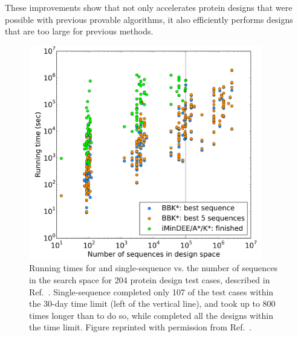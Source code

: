 These improvements show that \bbks not only accelerates protein designs that were possible with previous provable algorithms, it also efficiently performs designs that are too large for previous methods.

\begin{figure}
\center
\includegraphics[width=4in]{figures/bbks.png}
\caption{Running times for \bbks and single-sequence \ks vs. the number of sequences in the search space for 204 protein design test cases, described in Ref.~.  Single-sequence \ks completed only 107 of the test cases within the 30-day time limit (left of the vertical line), and took up to 800 times longer than \bbks to do so, while \bbks completed all the designs within the time limit.  Figure reprinted with permission from Ref.~.  }
\label{fig:bbks}
\end{figure}
